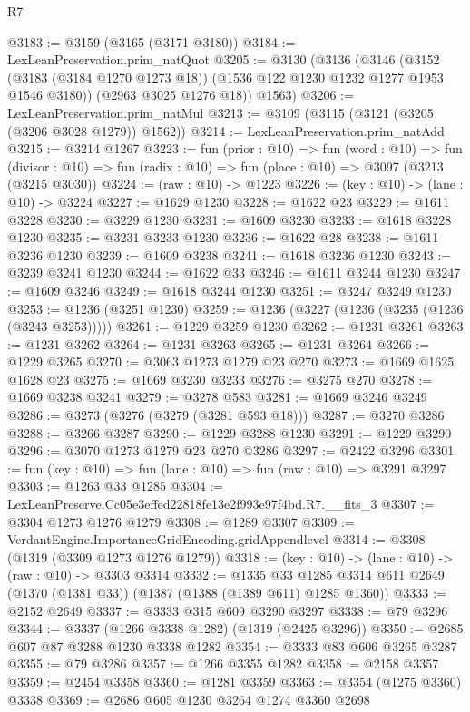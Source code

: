 \begin{lexlean}{R7}
\begin{coremodule}
@3183 := @3159 (@3165 (@3171 @3180))
@3184 := LexLeanPreservation.prim_natQuot
@3205 := @3130
    (@3136
      (@3146
        (@3152 (@3183 (@3184 @1270 @1273 @18)) (@1536 @122 @1230 @1232 @1277 @1953 @1546 @3180))
        (@2963 @3025 @1276 @18))
      @1563)
@3206 := LexLeanPreservation.prim_natMul
@3213 := @3109 (@3115 (@3121 (@3205 (@3206 @3028 @1279)) @1562))
@3214 := LexLeanPreservation.prim_natAdd
@3215 := @3214 @1267
@3223 := fun (prior : @10) =>
  fun (word : @10) =>
  fun (divisor : @10) => fun (radix : @10) => fun (place : @10) => @3097 (@3213 (@3215 @3030))
@3224 := (raw : @10) -> @1223
@3226 := (key : @10) -> (lane : @10) -> @3224
@3227 := @1629 @1230
@3228 := @1622 @23
@3229 := @1611 @3228
@3230 := @3229 @1230
@3231 := @1609 @3230
@3233 := @1618 @3228 @1230
@3235 := @3231 @3233 @1230
@3236 := @1622 @28
@3238 := @1611 @3236 @1230
@3239 := @1609 @3238
@3241 := @1618 @3236 @1230
@3243 := @3239 @3241 @1230
@3244 := @1622 @33
@3246 := @1611 @3244 @1230
@3247 := @1609 @3246
@3249 := @1618 @3244 @1230
@3251 := @3247 @3249 @1230
@3253 := @1236 (@3251 @1230)
@3259 := @1236 (@3227 (@1236 (@3235 (@1236 (@3243 @3253)))))
@3261 := @1229 @3259 @1230
@3262 := @1231 @3261
@3263 := @1231 @3262
@3264 := @1231 @3263
@3265 := @1231 @3264
@3266 := @1229 @3265
@3270 := @3063 @1273 @1279 @23 @270
@3273 := @1669 @1625 @1628 @23
@3275 := @1669 @3230 @3233
@3276 := @3275 @270
@3278 := @1669 @3238 @3241
@3279 := @3278 @583
@3281 := @1669 @3246 @3249
@3286 := @3273 (@3276 (@3279 (@3281 @593 @18)))
@3287 := @3270 @3286
@3288 := @3266 @3287
@3290 := @1229 @3288 @1230
@3291 := @1229 @3290
@3296 := @3070 @1273 @1279 @23 @270 @3286
@3297 := @2422 @3296
@3301 := fun (key : @10) => fun (lane : @10) => fun (raw : @10) => @3291 @3297
@3303 := @1263 @33 @1285
@3304 := LexLeanPreserve.Cc05e3effed22818fe13e2f993e97f4bd.R7.__fits_3
@3307 := @3304 @1273 @1276 @1279
@3308 := @1289 @3307
@3309 := VerdantEngine.ImportanceGridEncoding.gridAppendlevel
@3314 := @3308 (@1319 (@3309 @1273 @1276 @1279))
@3318 := (key : @10) -> (lane : @10) -> (raw : @10) -> @3303 @3314
@3332 := @1335
    @33
    @1285
    @3314
    @611
    @2649
    (@1370 (@1381 @33))
    (@1387 (@1388 (@1389 @611) @1285 @1360))
@3333 := @2152 @2649
@3337 := @3333 @315 @609 @3290 @3297
@3338 := @79 @3296
@3344 := @3337 (@1266 @3338 @1282) (@1319 (@2425 @3296))
@3350 := @2685 @607 @87 @3288 @1230 @3338 @1282
@3354 := @3333 @83 @606 @3265 @3287
@3355 := @79 @3286
@3357 := @1266 @3355 @1282
@3358 := @2158 @3357
@3359 := @2454 @3358
@3360 := @1281 @3359
@3363 := @3354 (@1275 @3360) @3338
@3369 := @2686 @605 @1230 @3264 @1274 @3360 @2698

\end{coremodule}
\end{lexlean}
